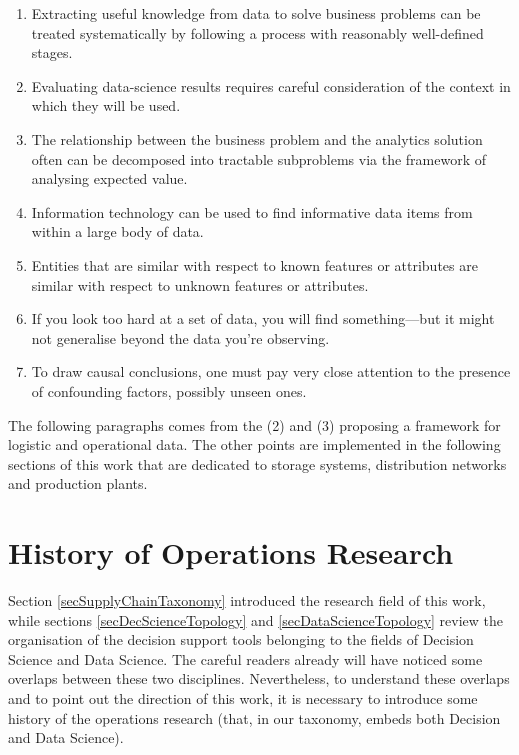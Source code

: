 \begin{enumerate}
    \item Extracting useful knowledge from data to solve business problems can be treated systematically by following a process with reasonably well-deﬁned stages.
    \item Evaluating data-science results requires careful consideration of the context in which they will be used.
    \item The relationship between the business problem and the analytics solution often can be decomposed into tractable subproblems via the framework of analysing expected value.
    \item Information technology can be used to ﬁnd informative data items from within a large body of data.
    \item Entities that are similar with respect to known features or attributes are similar with respect to unknown features or attributes.
    \item If you look too hard at a set of data, you will ﬁnd something—but it might not generalise beyond the data you’re observing.
   \item To draw causal conclusions, one must pay very close attention to the presence of confounding factors, possibly unseen ones.

\end{enumerate}

The following paragraphs comes from the (2) and (3) proposing a framework for logistic and operational data. The other points are implemented in the following sections of this work that are dedicated to storage systems, distribution networks and production plants.

\section{History of Operations Research}
Section \ref{secSupplyChainTaxonomy} introduced the research field of this work, while sections \ref{secDecScienceTopology} and \ref{secDataScienceTopology} review the organisation of the decision support tools belonging to the fields of Decision Science and Data Science. The careful readers already will have noticed some overlaps between these two disciplines. Nevertheless, to understand these overlaps and to point out the direction of this work, it is necessary to introduce some history of the operations research (that, in our taxonomy, embeds both Decision and Data Science). \par

